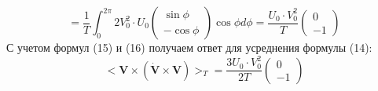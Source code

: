 \documentclass[12pt]{article}
\begin{document}
	\begin{equation}
		= \frac{1}{T}\int_0^{2\pi} 2V_0^2\cdot U_0 \begin{pmatrix}\sin \phi \\ -\cos \phi\end{pmatrix}\cos \phi d\phi = \frac{U_0 \cdot V_0^2}{T} \begin{pmatrix}0\\-1\end{pmatrix}
	\end{equation}
	С учетом формул (15) и (16) получаем ответ для усреднения формулы (14):
	\begin{equation}\Big<\mathbf{V\times(\dot{V}\times V)}\Big>_T = \frac{3 U_0 \cdot V_0^2}{2 T}\begin{pmatrix}0 \\ -1\end{pmatrix}\end{equation}
	
\end{document}
